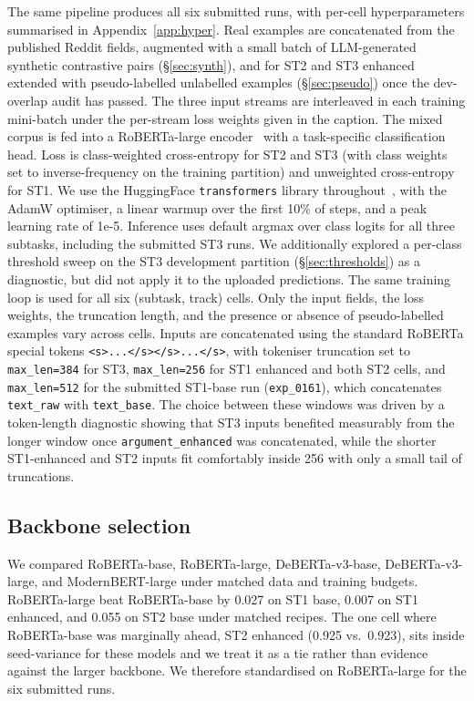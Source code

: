 The same pipeline produces all six submitted runs, with per-cell hyperparameters summarised in Appendix~\ref{app:hyper}. Real examples are concatenated from the published Reddit fields, augmented with a small batch of LLM-generated synthetic contrastive pairs (\S\ref{sec:synth}), and for ST2 and ST3 enhanced extended with pseudo-labelled unlabelled examples (\S\ref{sec:pseudo}) once the dev-overlap audit has passed. The three input streams are interleaved in each training mini-batch under the per-stream loss weights given in the caption. The mixed corpus is fed into a RoBERTa-large encoder~\cite{liu2019roberta} with a task-specific classification head. Loss is class-weighted cross-entropy for ST2 and ST3 (with class weights set to inverse-frequency on the training partition) and unweighted cross-entropy for ST1. We use the HuggingFace \texttt{transformers} library throughout~\cite{wolf2020transformers}, with the AdamW optimiser, a linear warmup over the first 10\% of steps, and a peak learning rate of 1e-5. Inference uses default argmax over class logits for all three subtasks, including the submitted ST3 runs. We additionally explored a per-class threshold sweep on the ST3 development partition (\S\ref{sec:thresholds}) as a diagnostic, but did not apply it to the uploaded predictions. The same training loop is used for all six (subtask, track) cells. Only the input fields, the loss weights, the truncation length, and the presence or absence of pseudo-labelled examples vary across cells. Inputs are concatenated using the standard RoBERTa special tokens \texttt{<s>...</s></s>...</s>}, with tokeniser truncation set to \texttt{max\_len=384} for ST3, \texttt{max\_len=256} for ST1 enhanced and both ST2 cells, and \texttt{max\_len=512} for the submitted ST1-base run (\texttt{exp\_0161}), which concatenates \texttt{text\_raw} with \texttt{text\_base}. The choice between these windows was driven by a token-length diagnostic showing that ST3 inputs benefited measurably from the longer window once \texttt{argument\_enhanced} was concatenated, while the shorter ST1-enhanced and ST2 inputs fit comfortably inside 256 with only a small tail of truncations. %

\subsection{Backbone selection}
\label{sec:backbone}

We compared RoBERTa-base, RoBERTa-large, DeBERTa-v3-base, DeBERTa-v3-large, and ModernBERT-large under matched data and training budgets. RoBERTa-large beat RoBERTa-base by 0.027 on ST1 base, 0.007 on ST1 enhanced, and 0.055 on ST2 base under matched recipes. %
The one cell where RoBERTa-base was marginally ahead, ST2 enhanced (0.925 vs.\ 0.923), sits inside seed-variance for these models and we treat it as a tie rather than evidence against the larger backbone. %
We therefore standardised on RoBERTa-large for the six submitted runs.

